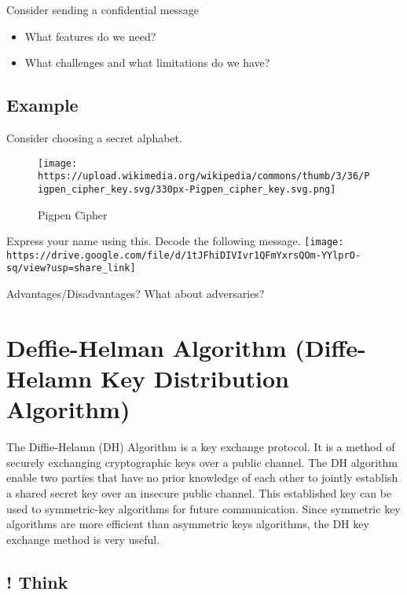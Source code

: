 \documentclass[
]{book}
\providecommand{\tightlist}{%
  \setlength{\itemsep}{0pt}\setlength{\parskip}{0pt}}
\begin{document}
Consider sending a confidential message

\begin{itemize}
\tightlist
\item
  What features do we need?
\item
  What challenges and what limitations do we have?
\end{itemize}

\hypertarget{example}{%
\section{Example}\label{example}}

Consider choosing a secret alphabet.

\begin{figure}
\centering
\texttt{[image: https://upload.wikimedia.org/wikipedia/commons/thumb/3/36/Pigpen\_cipher\_key.svg/330px-Pigpen\_cipher\_key.svg.png]}
\caption{Pigpen Cipher}
\end{figure}

Express your name using this.
Decode the following message.
\texttt{[image: https://drive.google.com/file/d/1tJFhiDIVIvr1QFmYxrsQOm-YYlprO-sq/view?usp=share\_link]}

Advantages/Disadvantages?
What about adversaries?

\hypertarget{deffie-helman-algorithm-diffe-helamn-key-distribution-algorithm}{%
\chapter{Deffie-Helman Algorithm (Diffe-Helamn Key Distribution Algorithm)}\label{deffie-helman-algorithm-diffe-helamn-key-distribution-algorithm}}

The Diffie-Helamn (DH) Algorithm is a key exchange protocol. It is a method of securely exchanging cryptographic keys over a public channel. The DH algorithm enable two parties that have no prior knowledge of each other to jointly establish a shared secret key over an insecure public channel. This established key can be used to symmetric-key algorithms for future communication. Since symmetric key algorithms are more efficient than asymmetric keys algorithms, the DH key exchange method is very useful.

\hypertarget{think}{%
\section*{! Think}\label{think}}
\end{document}
